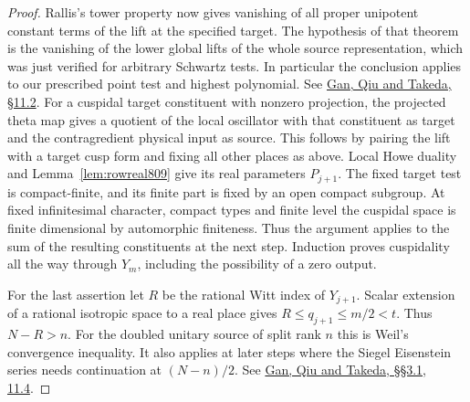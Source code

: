 \documentclass[a4paper,11pt]{article}
\theoremstyle{definition}
\theoremstyle{remark}
\numberwithin{equation}{section}
\begin{document}
\begin{proof}
Rallis's tower property now gives vanishing of all proper
unipotent constant terms of the lift at the specified target.
The hypothesis of that theorem is the vanishing of the lower
global lifts of the whole source representation, which was
just verified for arbitrary Schwartz tests. In particular the
conclusion applies to our prescribed point test and highest
polynomial. See \href{https://arxiv.org/pdf/1207.4709}
{Gan, Qiu and Takeda, \S11.2}. For a cuspidal target constituent
with nonzero projection, the projected theta map gives a quotient
of the local oscillator with that constituent as target and
the contragredient physical input as source. This follows by
pairing the lift with a target cusp form and fixing all other
places as above. Local Howe duality and
Lemma~\ref{lem:rowreal809} give its real parameters \(P_{j+1}\).
The fixed target test is compact-finite, and its finite part
is fixed by an open compact subgroup. At fixed infinitesimal
character, compact types and finite level the cuspidal space
is finite dimensional by automorphic finiteness. Thus the
argument applies to the sum of the resulting constituents at
the next step. Induction proves cuspidality all the way through
\(Y_m\), including the possibility of a zero output.

For the last assertion let \(R\) be the rational Witt index of
\(Y_{j+1}\). Scalar extension of a rational isotropic space to a
real place gives \(R\leq q_{j+1}\leq m/2<t\). Thus \(N-R>n\).
For the doubled unitary source of split rank \(n\) this is
Weil's convergence inequality. It also applies at later steps
where the Siegel Eisenstein series needs continuation at
\((N-n)/2\). See \href{https://arxiv.org/pdf/1207.4709}
{Gan, Qiu and Takeda, \S\S3.1, 11.4}.
\end{proof}
\end{document}
